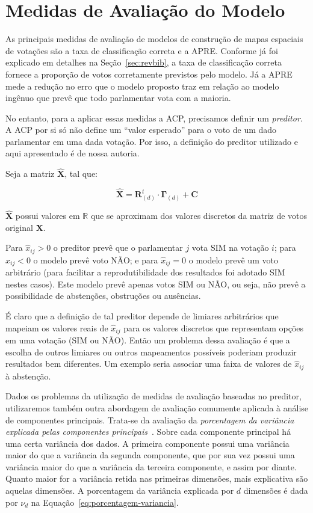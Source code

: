 \documentclass[a4paper, 12pt]{article}
\newcommand\nay{NÃO\xspace}
\newcommand\yea{SIM\xspace}
\begin{document}
\section{Medidas de Avaliação do Modelo}
\label{sec:avaliacao}

As principais medidas de avaliação de modelos de construção de mapas espaciais de votações são a taxa de classificação correta e a APRE. Conforme já foi explicado em detalhes na Seção~\ref{sec:revbib}, a taxa de classificação correta fornece a proporção de votos corretamente previstos pelo modelo. Já a APRE mede a redução no erro que o modelo proposto traz em relação ao modelo ingênuo que prevê que todo parlamentar vota com a maioria.

No entanto, para a aplicar essas medidas a ACP, precisamos definir um \emph{preditor}. A ACP por si só não define um ``valor esperado'' para o voto de um dado parlamentar em uma dada votação. Por isso, a definição do preditor utilizado e aqui apresentado é de nossa autoria.

Seja a matriz $\mathbf{\widehat{X}}$, tal que:

\begin{equation}
  \widehat{\mathbf{X}} = \mathbf{R}_{(d)}^{t} \cdot \mathbf{\Gamma}_{(d)} + \mathbf{C}
\end{equation}

$\widehat{\mathbf{X}}$ possui valores em $\mathbb{R}$ que se aproximam dos valores discretos da matriz de votos original $\mathbf{X}$.

Para $\widehat{x}_{ij} > 0$ o preditor prevê que o parlamentar $j$ vota SIM na votação $i$; para $\widehat{x}_{ij} < 0$ o modelo prevê voto NÃO; e para $\widehat{x}_{ij} = 0$ o modelo prevê um voto arbitrário (para facilitar a reprodutibilidade dos resultados foi adotado SIM nestes casos). Este modelo prevê apenas votos \yea ou \nay, ou seja, não prevê a possibilidade de abstenções, obstruções ou ausências.

É claro que a definição de tal preditor depende de limiares arbitrários que mapeiam os valores reais de $\widehat{x}_{ij}$ para os valores discretos que representam opções em uma votação (\yea ou \nay). Então um problema dessa avaliação é que a escolha de outros limiares ou outros mapeamentos possíveis poderiam produzir resultados bem diferentes. Um exemplo seria associar uma faixa de valores de $\widehat{x}_{ij}$ à abstenção.

Dados os problemas da utilização de medidas de avaliação baseadas no preditor, utilizaremos também outra abordagem de avaliação comumente aplicada à análise de componentes principais. Trata-se da avaliação da \emph{porcentagem da variância explicada pelas componentes principais}~\cite{DataMining2003}. Sobre cada componente principal há uma certa variância dos dados. A primeira componente possui uma variância maior do que a variância da segunda componente, que por sua vez possui uma variância maior do que a variância da terceira componente, e assim por diante. Quanto maior for a variância retida nas primeiras dimensões, mais explicativa são aquelas dimensões. A porcentagem da variância explicada por $d$ dimensões é dada por $\nu_d$ na Equação~\ref{eq:porcentagem-variancia}.
\end{document}
